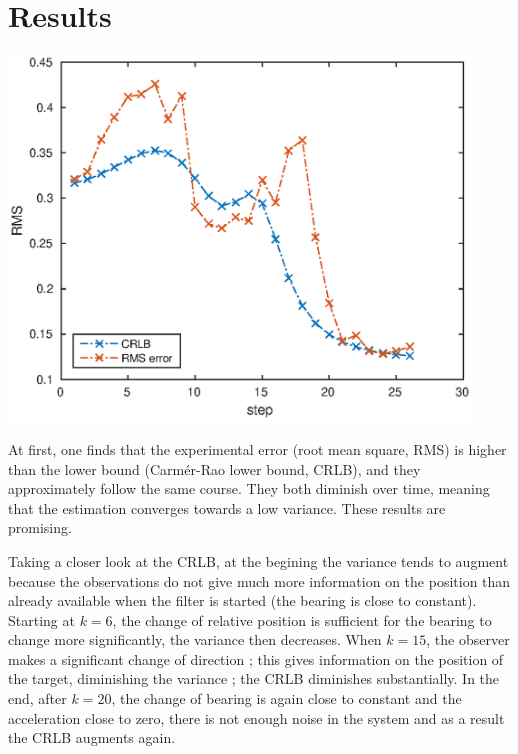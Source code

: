 \documentclass[english,DIV=13]{scrreprt}
\begin{document}
\section*{Results}
\begin{center}
   \includegraphics[width=0.92\textwidth]{img/q6.eps}
\end{center}

At first, one finds that the experimental error (root mean square, RMS) is higher than the lower bound (Carmér-Rao lower bound,
CRLB), and they approximately follow the same course. They both diminish over time, meaning that the estimation converges towards a low variance. These results
 are promising.

Taking a closer look at the CRLB, at the begining the variance tends to augment because the observations do not give much
more information on the position than already available when the filter is started
(the bearing is close to constant). Starting at $k=6$, the change
of relative position is sufficient for the bearing to change more significantly, the variance then decreases.
When $k=15$, the observer makes a significant change of direction ; this gives information on the position of the
target, diminishing the variance ;  the CRLB diminishes substantially. In the end, after $k=20$, the change of bearing is again
close to constant and the acceleration close to zero, there is not enough noise in the system and as a result the CRLB augments
again.\\
\end{document}
